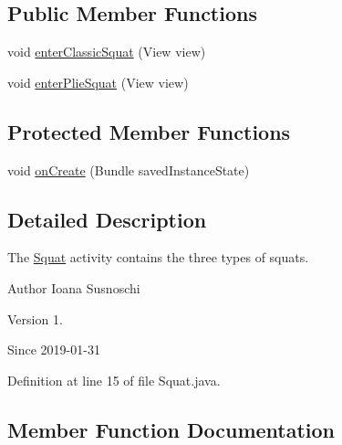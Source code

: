 \subsection*{Public Member Functions}
\begin{DoxyCompactItemize}
\item 
void \mbox{\hyperlink{classcom_1_1example_1_1trainawearapplication_1_1_squat_aefefdea9b19687975d42841285ae8529}{enter\+Classic\+Squat}} (View view)
\item 
void \mbox{\hyperlink{classcom_1_1example_1_1trainawearapplication_1_1_squat_aa6869623862d4279d1a47e89b34cafb4}{enter\+Plie\+Squat}} (View view)
\end{DoxyCompactItemize}
\subsection*{Protected Member Functions}
\begin{DoxyCompactItemize}
\item 
void \mbox{\hyperlink{classcom_1_1example_1_1trainawearapplication_1_1_squat_a2ee401e1a295432f8196e77dcca9df5f}{on\+Create}} (Bundle saved\+Instance\+State)
\end{DoxyCompactItemize}


\subsection{Detailed Description}
The \mbox{\hyperlink{classcom_1_1example_1_1trainawearapplication_1_1_squat}{Squat}} activity contains the three types of squats. 

\begin{DoxyAuthor}{Author}
Ioana Susnoschi 
\end{DoxyAuthor}
\begin{DoxyVersion}{Version}
1. 
\end{DoxyVersion}
\begin{DoxySince}{Since}
2019-\/01-\/31 
\end{DoxySince}


Definition at line 15 of file Squat.\+java.



\subsection{Member Function Documentation}
\mbox{\label{classcom_1_1example_1_1trainawearapplication_1_1_squat_aefefdea9b19687975d42841285ae8529}} 
